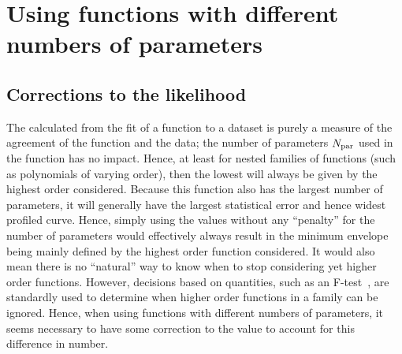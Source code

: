 \section{Using functions with different numbers of parameters} %
\label{sec:correction}

\subsection{Corrections to the likelihood}
\label{sec:correction:corrections}

The \nll calculated from the fit of a function to a dataset is purely a measure
of the agreement of the function and the data; the 
number of parameters $N_{\rm par}$
used in the function has no impact. Hence, at least for nested families of
functions (such as polynomials of varying order), then the lowest \nll will
always be given by the highest order considered.
Because this function also has the
largest number of parameters, it will generally have the largest statistical
error and hence widest profiled \nll curve.
Hence, simply using the \nll values
without any ``penalty'' for the number of parameters would effectively
always result in the minimum envelope being mainly defined by the highest
order function considered. It would also mean there is no ``natural'' way to know when
to stop considering yet higher order functions. However, decisions based
on quantities, such as an F-test~\cite{ref:ftest},
are standardly used to determine when higher order functions in
a family can be ignored. Hence, when using functions with different
numbers of parameters, it seems necessary to have some correction to the \nll
value to account for this difference in number.

